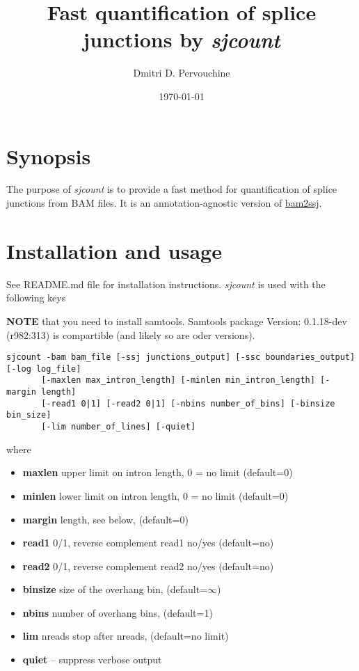 \documentclass{article}
\begin{document}
\title{Fast quantification of splice junctions by {\em sjcount}}
\author{Dmitri D. Pervouchine}
\date{\today}
\maketitle

\section{Synopsis}

The purpose of {\em sjcount} is to provide a fast method for quantification of splice junctions from BAM files. It is an annotation-agnostic version of 
\href{https://github.com/pervouchine/bam2ssj}{bam2ssj}.


\section{Installation and usage}

See README.md file for installation instructions. {\em sjcount} is used with the following keys

{\bf NOTE} that you need to install samtools.
Samtools package Version: 0.1.18-dev (r982:313) is compartible (and likely so are oder versions).

\begin{verbatim}
sjcount -bam bam_file [-ssj junctions_output] [-ssc boundaries_output] [-log log_file] 
       [-maxlen max_intron_length] [-minlen min_intron_length] [-margin length] 
       [-read1 0|1] [-read2 0|1] [-nbins number_of_bins] [-binsize bin_size] 
       [-lim number_of_lines] [-quiet]
\end{verbatim}
where
\begin{itemize}
\item {\bf maxlen} upper limit on intron length, 0 = no limit (default=0)
\item {\bf minlen} lower limit on intron length, 0 = no limit (default=0)
\item {\bf margin} length, see below, (default=0)
\item {\bf read1} 0/1, reverse complement read1 no/yes (default=no)
\item {\bf read2} 0/1, reverse complement read2 no/yes (default=no)
\item {\bf binsize} size of the overhang bin, (default=$\infty$)
\item {\bf nbins} number of overhang bins, (default=1)
\item {\bf lim} nreads stop after nreads, (default=no limit)
\item {\bf quiet} -- suppress verbose output
\end{itemize}
\end{document}

